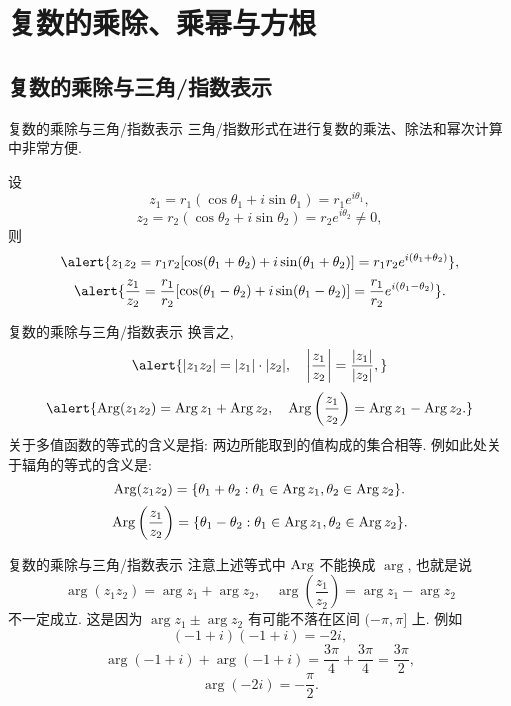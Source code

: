 \section{复数的乘除、乘幂与方根}

\subsection{复数的乘除与三角/指数表示}
\begin{frame}{复数的乘除与三角/指数表示}
	\onslide<+->
	三角/指数形式在进行复数的乘法、除法和幂次计算中非常方便.

	\onslide<+->
	\begin{theorem}
		设
		\[z_1=r_1(\cos\theta_1+i\sin\theta_1)=r_1e^{i\theta_1},\]
		\[z_2=r_2(\cos\theta_2+i\sin\theta_2)=r_2e^{i\theta_2}\neq 0,\]
		则
		\[\alert{z_1z_2=r_1r_2[\cos(\theta_1+\theta_2)+i\sin(\theta_1+\theta_2)]=r_1r_2e^{i(\theta_1+\theta_2)}},\]
		\[\alert{\frac{z_1}{z_2}=\frac{r_1}{r_2}[\cos(\theta_1-\theta_2)+i\sin(\theta_1-\theta_2)]=\frac{r_1}{r_2}e^{i(\theta_1-\theta_2)}}.\]
	\end{theorem}
\end{frame}


\begin{frame}{复数的乘除与三角/指数表示}
	\onslide<+->
	换言之,
	\[\alert{|z_1z_2|=|z_1|\cdot|z_2|,\quad\abs{\frac{z_1}{z_2}}=\frac{|z_1|}{|z_2|},}\]
	\onslide<+->
	\[\alert{\Arg(z_1z_2)=\Arg z_1+\Arg z_2,\quad
	\Arg\left(\frac{z_1}{z_2}\right)=\Arg z_1-\Arg z_2.}\]
	\onslide<+->
	关于多值函数的等式的含义是指: 两边所能取到的值构成的集合相等.
	\onslide<+->
	例如此处关于辐角的等式的含义是:
	\[\operatorname{Arg}(z_1z_2)={\left\{\theta_1+\theta_2:\theta_1\in\operatorname{Arg} z_1,\theta_2\in\operatorname{Arg} z_2\right\}}.\]
	\[\operatorname{Arg}\left(\frac{z_1}{z_2}\right)={\left\{\theta_1-\theta_2:\theta_1\in\operatorname{Arg} z_1,\theta_2\in\operatorname{Arg} z_2\right\}}.\]
\end{frame}


\begin{frame}{复数的乘除与三角/指数表示}
	\onslide<+->
	注意上述等式中 $\operatorname{Arg}$ 不能换成 $\arg$, 也就是说
	\[\arg(z_1z_2)=\arg z_1+\arg z_2,\quad
	\arg\left(\frac{z_1}{z_2}\right)=\arg z_1-\arg z_2\]
	\alert{不一定成立}.
	\onslide<+->
	这是因为 $\arg z_1\pm\arg z_2$ 有可能不落在区间 $(-\pi,\pi]$ 上.
	\onslide<+->
	例如
	\[(-1+i)(-1+i)=-2i,\]
	\vspace{-0.5\baselineskip}
	\onslide<+->
	\[\arg(-1+i)+\arg(-1+i)=\frac{3\pi}4+\frac{3\pi}4=\frac{3\pi}2,\]
	\vspace{-0.5\baselineskip}
	\onslide<+->
	\[\arg(-2i)=-\frac\pi2.\]
\end{frame}


